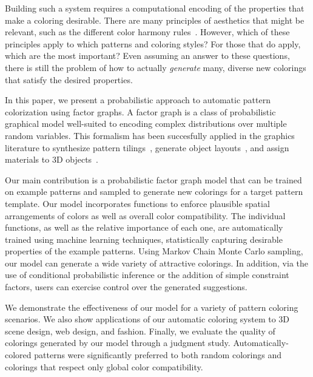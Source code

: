 Building such a system requires a computational encoding of the properties that make a coloring desirable. There are many principles of aesthetics that might be relevant, such as the different color harmony rules~\cite{ColorHarmonyBook}. However, which of these principles apply to which patterns and coloring styles? For those that do apply, which are the most important? Even assuming an answer to these questions, there is still the problem of how to actually \emph{generate} many, diverse new colorings that satisfy the desired properties.

In this paper, we present a probabilistic approach to automatic pattern colorization using factor graphs. A factor graph is a class of probabilistic graphical model well-suited to encoding complex distributions over multiple random variables. This formalism has been succesfully applied in the graphics literature to synthesize pattern tilings~\cite{YiTingTiledPatterns}, generate object layouts~\cite{YiTingLARJ}, and assign materials to 3D objects~\cite{MaterialMemex}.

Our main contribution is a probabilistic factor graph model that can be trained on example patterns and sampled to generate new colorings for a target pattern template. Our model incorporates functions to enforce plausible spatial arrangements of colors as well as overall color compatibility. The individual functions, as well as the relative importance of each one, are automatically trained using machine learning techniques, statistically capturing desirable properties of the example patterns. Using Markov Chain Monte Carlo sampling, our model can generate a wide variety of attractive colorings. In addition, via the use of conditional probabilistic inference or the addition of simple constraint factors, users can exercise control over the generated suggestions.

We demonstrate the effectiveness of our model for a variety of pattern coloring scenarios. We also show applications of our automatic coloring system to 3D scene design, web design, and fashion. Finally, we evaluate the quality of colorings generated by our model through a judgment study. Automatically-colored patterns were significantly preferred to both random colorings and colorings that respect only global color compatibility.
